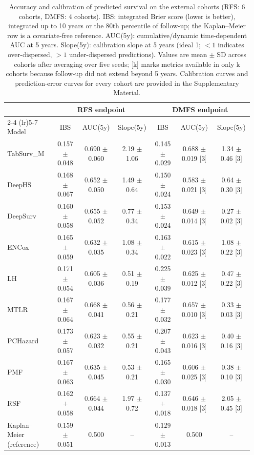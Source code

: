 \begin{table}[t]
\centering
\caption{Accuracy and calibration of predicted survival on the external cohorts (RFS: 6 cohorts, DMFS: 4 cohorts). IBS: integrated Brier score (lower is better), integrated up to 10 years or the 80th percentile of follow-up; the Kaplan--Meier row is a covariate-free reference. AUC(5y): cumulative/dynamic time-dependent AUC at 5 years. Slope(5y): calibration slope at 5 years (ideal 1; $<1$ indicates over-dispersed, $>1$ under-dispersed predictions). Values are mean $\pm$ SD across cohorts after averaging over five seeds; [k] marks metrics available in only k cohorts because follow-up did not extend beyond 5 years. Calibration curves and prediction-error curves for every cohort are provided in the Supplementary Material.}
\label{tab:calibration}
\footnotesize
\setlength{\tabcolsep}{4pt}
\begin{tabular}{lcccccc}
\toprule
 & \multicolumn{3}{c}{RFS endpoint} & \multicolumn{3}{c}{DMFS endpoint} \\
\cmidrule(lr){2-4} \cmidrule(lr){5-7}
Model & IBS & AUC(5y) & Slope(5y) & IBS & AUC(5y) & Slope(5y) \\
\midrule
TabSurv\_M & 0.157 $\pm$ 0.048 & 0.690 $\pm$ 0.060 & 2.19 $\pm$ 1.06 & 0.145 $\pm$ 0.029 & 0.688 $\pm$ 0.019 [3] & 1.34 $\pm$ 0.46 [3] \\
DeepHS & 0.168 $\pm$ 0.067 & 0.652 $\pm$ 0.050 & 1.49 $\pm$ 0.64 & 0.150 $\pm$ 0.024 & 0.583 $\pm$ 0.021 [3] & 0.64 $\pm$ 0.30 [3] \\
DeepSurv & 0.160 $\pm$ 0.058 & 0.655 $\pm$ 0.052 & 0.77 $\pm$ 0.34 & 0.153 $\pm$ 0.024 & 0.649 $\pm$ 0.014 [3] & 0.27 $\pm$ 0.02 [3] \\
ENCox & 0.165 $\pm$ 0.059 & 0.632 $\pm$ 0.035 & 1.08 $\pm$ 0.34 & 0.163 $\pm$ 0.022 & 0.615 $\pm$ 0.023 [3] & 1.08 $\pm$ 0.22 [3] \\
LH & 0.171 $\pm$ 0.054 & 0.605 $\pm$ 0.036 & 0.51 $\pm$ 0.19 & 0.225 $\pm$ 0.039 & 0.625 $\pm$ 0.012 [3] & 0.47 $\pm$ 0.22 [3] \\
MTLR & 0.167 $\pm$ 0.064 & 0.668 $\pm$ 0.041 & 0.56 $\pm$ 0.21 & 0.177 $\pm$ 0.032 & 0.657 $\pm$ 0.010 [3] & 0.33 $\pm$ 0.03 [3] \\
PCHazard & 0.173 $\pm$ 0.057 & 0.623 $\pm$ 0.032 & 0.55 $\pm$ 0.21 & 0.207 $\pm$ 0.043 & 0.623 $\pm$ 0.016 [3] & 0.40 $\pm$ 0.16 [3] \\
PMF & 0.167 $\pm$ 0.063 & 0.635 $\pm$ 0.045 & 0.53 $\pm$ 0.21 & 0.165 $\pm$ 0.030 & 0.606 $\pm$ 0.025 [3] & 0.38 $\pm$ 0.10 [3] \\
RSF & 0.162 $\pm$ 0.058 & 0.664 $\pm$ 0.044 & 1.97 $\pm$ 0.72 & 0.137 $\pm$ 0.018 & 0.646 $\pm$ 0.018 [3] & 2.05 $\pm$ 0.45 [3] \\
\midrule
Kaplan--Meier (reference) & 0.159 $\pm$ 0.051 & 0.500 & -- & 0.129 $\pm$ 0.013 & 0.500 & -- \\
\bottomrule
\end{tabular}
\end{table}
